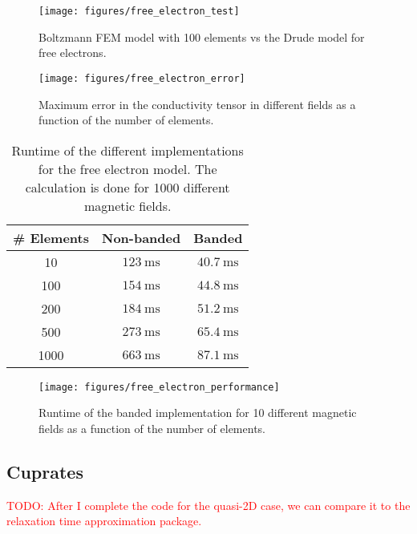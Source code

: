 \documentclass[12pt]{article}
\begin{document}
\begin{figure}
    \centering
    \texttt{[image: figures/free\_electron\_test]}
    \caption{Boltzmann FEM model with 100 elements vs the Drude model for free electrons.}
    \label{fig:test}
\end{figure}

\begin{figure}
    \centering
    \texttt{[image: figures/free\_electron\_error]}
    \caption{Maximum error in the conductivity tensor in different fields as a function of the
        number of elements.}
    \label{fig:error}
\end{figure}

\begin{table}
    \centering
    \begin{tabular}{|c|c|c|}
        \hline
        \# Elements & Non-banded & Banded \\
        \hline
        10 & $\SI{123}{\milli\second}$ & $\SI{40.7}{\milli\second}$ \\
        100 & $\SI{154}{\milli\second}$ & $\SI{44.8}{\milli\second}$ \\
        200 & $\SI{184}{\milli\second}$ & $\SI{51.2}{\milli\second}$ \\
        500 & $\SI{273}{\milli\second}$ & $\SI{65.4}{\milli\second}$ \\
        1000 & $\SI{663}{\milli\second}$ & $\SI{87.1}{\milli\second}$ \\
        \hline
    \end{tabular}
    \caption{Runtime of the different implementations for the free electron model.
        The calculation is done for 1000 different magnetic fields.}
    \label{tab:performance}
\end{table}

\begin{figure}
    \centering
    \texttt{[image: figures/free\_electron\_performance]}
    \caption{Runtime of the banded implementation for 10 different magnetic fields as a function
        of the number of elements.}
    \label{fig:performance}
\end{figure}

\subsection{Cuprates}
\textcolor{red}{TODO: After I complete the code for the quasi-2D case, we can compare it to the
    relaxation time approximation package.}
\end{document}
